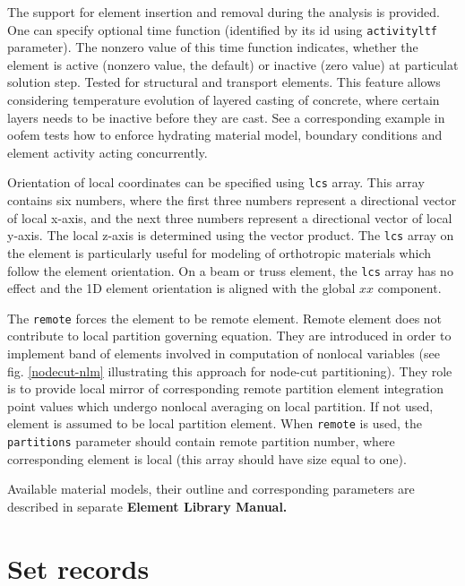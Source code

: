 \documentclass[a4paper]{report}
\newcommand{\param}[1]{\texttt{#1}} %
\newcommand{\Pmode}[1]{{\sffamily #1}}
\begin{document}
The support for element insertion and removal during the analysis is provided. One can specify optional time function (identified by its id using \param{activityltf} parameter). The nonzero value of this time function indicates, whether the element is active (nonzero value, the default) or inactive (zero value) at particulat solution step. Tested for structural and transport elements. This feature allows considering temperature evolution of layered casting of concrete, where certain layers needs to be inactive before they are cast. See a corresponding example in oofem
tests how to enforce hydrating material model, boundary conditions and element activity acting concurrently.

Orientation of local coordinates can be specified using \param{lcs} array. This array contains six numbers,
where the first three numbers represent a directional vector of local
x-axis, and the next three numbers represent a directional vector of local
y-axis. The local z-axis is determined using the vector product. The \param{lcs} array on the element is particularly useful for modeling of orthotropic materials which follow the element orientation. On a beam or truss element, the \param{lcs} array has no effect and the 1D element orientation is aligned with the global $xx$ component.

\Pmode{
The \param{remote} forces the element to be remote element. Remote
element does not contribute to local partition governing equation.
They are introduced in order to implement band of elements involved
in computation of nonlocal variables (see fig. \ref{nodecut-nlm} illustrating
this approach for node-cut partitioning). They role is to provide
local mirror of corresponding remote partition element integration point values which undergo
nonlocal averaging on local partition.
If not used, element is assumed to be local partition element.
When \param{remote} is used, the \param{partitions} parameter should
contain remote partition number, where
corresponding element is local (this array should have size equal to one).
}


Available material models, their outline and
corresponding parameters are described in separate \textbf{Element Library Manual.}


\section{Set records}
\label{_SetRecords}
\end{document}
